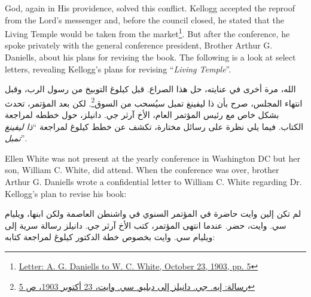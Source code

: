 God, again in His providence, solved this conflict. Kellogg accepted the reproof from the Lord's messenger and, before the council closed, he stated that the Living Temple would be taken from the market\footnote{\href{https://forgottenpillar.com/wp-content/uploads/2022/04/Letter-A-G-Daniells-to-W-C-White-October-29-1903.pdf}{Letter: A. G. Daniells to W. C. White, October 23, 1903, pp. 5}}. But after the conference, he spoke privately with the general conference president, Brother Arthur G. Daniells, about his plans for revising the book. The following is a look at select letters, revealing Kellogg's plans for revising “\textit{Living Temple}”.


الله، مرة أخرى في عنايته، حل هذا الصراع. قبل كيلوغ التوبيخ من رسول الرب، وقبل انتهاء المجلس، صرح بأن ذا ليفينغ تمبل سيُسحب من السوق\footnote{\href{https://forgottenpillar.com/wp-content/uploads/2022/04/Letter-A-G-Daniells-to-W-C-White-October-29-1903.pdf}{رسالة: إيه. جي. دانيلز إلى دبليو. سي. وايت، 23 أكتوبر 1903، ص 5}}. لكن بعد المؤتمر، تحدث بشكل خاص مع رئيس المؤتمر العام، الأخ آرثر جي. دانيلز، حول خططه لمراجعة الكتاب. فيما يلي نظرة على رسائل مختارة، تكشف عن خطط كيلوغ لمراجعة “\textit{ذا ليفينغ تمبل}”.


Ellen White was not present at the yearly conference in Washington DC but her son, William C. White, did attend. When the conference was over, brother Arthur G. Daniells wrote a confidential letter to William C. White regarding Dr. Kellogg's plan to revise his book:


لم تكن إلين وايت حاضرة في المؤتمر السنوي في واشنطن العاصمة ولكن ابنها، ويليام سي. وايت، حضر. عندما انتهى المؤتمر، كتب الأخ آرثر جي. دانيلز رسالة سرية إلى ويليام سي. وايت بخصوص خطة الدكتور كيلوغ لمراجعة كتابه:










